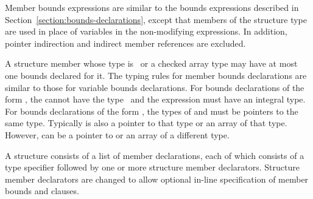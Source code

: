 Member bounds expressions are similar to the bounds expressions
described in Section~\ref{section:bounds-declarations}, 
except that members of the structure type are
used in place of variables in the non-modifying expressions. In
addition, pointer indirection and indirect member references are
excluded.

A structure member whose type is \arrayptr\ or a
checked array type may have at most one bounds declared for it. The
typing rules for member bounds declarations are similar to those for
variable bounds declarations. For bounds declarations of the form
, the
 cannot have the type \arrayptrvoid\ and
the expression  must have an integral type. For bounds declarations
of the form ,
the types of  and  must be pointers to the same type.
Typically  is also  a pointer to that type or an
array of that type.  However,  can be a pointer to
or an array of a different type.

A structure consists of a list of member declarations, each of which
consists of a type specifier followed by one or more structure member
declarators. Structure member declarators are changed to allow 
optional in-line specification of member bounds and 
clauses.

